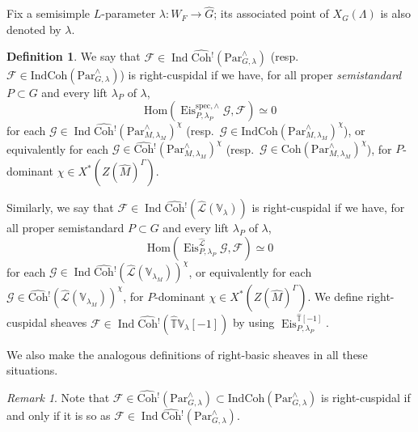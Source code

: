 \documentclass{amsart}
\theoremstyle{definition}
\newtheorem{definition}[theorem]{Definition}
\theoremstyle{remark}
\newtheorem{remark}[theorem]{Remark}
\numberwithin{equation}{section}
\DeclareMathOperator{\Ind}{Ind}
\newcommand{\mc}{\mathcal}
\newcommand{\Hom}{\mathrm{Hom}}
\newcommand{\spec}{\mathrm{spec}}
\newcommand{\wh}{\widehat}
\newcommand{\Par}{\mathrm{Par}}
\newcommand{\IndCoh}{\mathrm{IndCoh}}
\DeclareMathOperator{\Eis}{\mathrm{Eis}}
\newcommand{\Coh}{\mathrm{Coh}}
\newcommand{\V}{\mathbb{V}}
\newcommand{\T}{\mathbb{T}}
\begin{document}
Fix a semisimple $L$-parameter $\lambda\colon W_F\to \wh G$; its associated point of $X_G(\Lambda)$ is also denoted by $\lambda$. 

\begin{definition}{\label{def: cuspcompletion}}
We say that $\mc F\in \Ind\wh{\Coh}{}^!(\Par^{\wedge}_{G, \lambda})$ (resp.~$\mc F\in \IndCoh(\Par^{\wedge}_{G, \lambda})$) is right-cuspidal if we have, for all proper \emph{semistandard} $P\subset G$ and every lift $\lambda_P$ of $\lambda$,  
\[
\Hom(\Eis^{\spec, \wedge}_{P, \lambda_P} \mc{G}, \mc{F})\simeq 0
\]
for each $\mc{G} \in \Ind\wh{\Coh}{}^{!}(\Par^{\wedge}_{M, \lambda_M})^\chi$ (resp.~$\mc{G} \in \IndCoh(\Par^{\wedge}_{M, \lambda_M})^\chi$), or equivalently for each $\mc{G} \in \wh{\Coh}{}^{!}(\Par^{\wedge}_{M, \lambda_M})^\chi$ (resp.~$\mc{G} \in \Coh(\Par^{\wedge}_{M, \lambda_M})^\chi$), for $P$-dominant $\chi \in X^*(Z(\wh{M})^{\Gamma})$. 

Similarly, we say that $\mc F\in \Ind\wh{\Coh}{}^!(\wh{\mc L}(\V_\lambda))$ is right-cuspidal if we have, for all proper semistandard $P\subset G$ and every lift $\lambda_P$ of $\lambda$,  
\[
\Hom(\Eis^{\wh{\mc L}}_{P, \lambda_P} \mc{G}, \mc{F})\simeq 0
\]
for each $\mc{G} \in \Ind\wh{\Coh}{}^{!}(\wh{\mc L}(\V_{\lambda_M}))^\chi$, or equivalently for each $\mc{G} \in \wh{\Coh}{}^{!}(\wh{\mc L}(\V_{\lambda_M}))^\chi$, for $P$-dominant  $\chi \in X^*(Z(\wh{M})^{\Gamma})$. We define right-cuspidal sheaves $\mc F\in \Ind\wh{\Coh}{}^!(\wh{\T}\V_\lambda[-1])$ by using $\Eis^{\wh{\T}[-1]}_{P,\lambda_P}$.  

We also make the analogous definitions of right-basic sheaves in all these situations.
\end{definition}

\begin{remark}    
Note that $\mc F\in \wh{\Coh}{}^! (\Par_{G,\lambda}^\wedge)\subset \IndCoh(\Par_{G,\lambda}^\wedge)$ is right-cuspidal if and only if it is so as $\mc F\in \Ind\wh{\Coh}{}^!(\Par_{G,\lambda}^\wedge)$. 
\end{remark}
\end{document}
